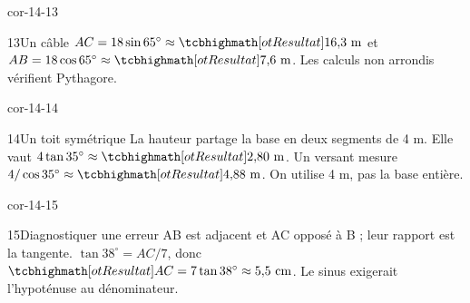 \begin{blocLivre}{cor-14-13}\begin{corrige}{13}{Un câble}
$AC=18\sin65^\circ\approx\res{16{,}3\text{ m}}$ et $AB=18\cos65^\circ\approx\res{7{,}6\text{ m}}$. Les calculs non arrondis vérifient Pythagore.
\label{fig-cor-14-13}
\end{corrige}\end{blocLivre}
\begin{blocLivre}{cor-14-14}\begin{corrige}{14}{Un toit symétrique}
La hauteur partage la base en deux segments de 4 m. Elle vaut $4\tan35^\circ\approx\res{2{,}80\text{ m}}$. Un versant mesure $4/\cos35^\circ\approx\res{4{,}88\text{ m}}$. On utilise 4 m, pas la base entière.
\label{fig-cor-14-14}
\end{corrige}\end{blocLivre}
\begin{blocLivre}{cor-14-15}\begin{corrige}{15}{Diagnostiquer une erreur}
AB est adjacent et AC opposé à B ; leur rapport est la tangente. $\tan38^\circ=AC/7$, donc $\res{AC=7\tan38^\circ\approx5{,}5\text{ cm}}$. Le sinus exigerait l’hypoténuse au dénominateur.
\label{fig-cor-14-15}
\end{corrige}\end{blocLivre}
